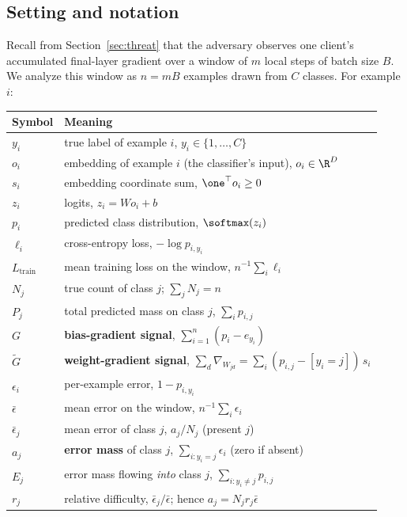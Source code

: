 \subsection{Setting and notation}
\label{sec:prelim-notation}

Recall from Section~\ref{sec:threat} that the adversary observes one
client's accumulated final-layer gradient over a window of $m$ local
steps of batch size $B$. We analyze this window as $n = mB$ examples drawn
from $C$ classes. For example $i$:

\begin{center}
\small
\renewcommand{\arraystretch}{1.15}
\begin{tabular}{@{}l p{}@{}}
\toprule
Symbol & Meaning \\
\midrule
$y_i$ & true label of example $i$, $y_i \in \{1,\dots,C\}$ \\
$o_i$ & embedding of example $i$ (the classifier's input), $o_i \in \R^D$ \\
$s_i$ & embedding coordinate sum, $\one^\top o_i \ge 0$ \\
$z_i$ & logits, $z_i = W o_i + b$ \\
$p_i$ & predicted class distribution, $\softmax(z_i)$ \\
$\ell_i$ & cross-entropy loss, $-\log p_{i,y_i}$ \\
$L_{\mathrm{train}}$ & mean training loss on the window, $n^{-1}\sum_i \ell_i$ \\
\midrule
$N_j$ & true count of class $j$; $\sum_j N_j = n$ \\
$P_j$ & total predicted mass on class $j$, $\sum_i p_{i,j}$ \\
$G$ & \textbf{bias-gradient signal}, $\sum_{i=1}^n (p_i - e_{y_i})$ \\
$\widetilde G$ & \textbf{weight-gradient signal}, $\sum_d \nabla_{W_{jd}} = \sum_i (p_{i,j}-[y_i{=}j])\,s_i$ \\
\midrule
$\epsilon_i$ & per-example error, $1 - p_{i,y_i}$ \\
$\bar\epsilon$ & mean error on the window, $n^{-1}\sum_i \epsilon_i$ \\
$\bar\epsilon_j$ & mean error of class $j$, $a_j/N_j$ (present $j$) \\
$a_j$ & \textbf{error mass} of class $j$, $\sum_{i:y_i=j}\epsilon_i$ (zero if absent) \\
$E_j$ & error mass flowing \emph{into} class $j$, $\sum_{i:y_i\ne j} p_{i,j}$ \\
\midrule
$r_j$ & relative difficulty, $\bar\epsilon_j/\bar\epsilon$; hence $a_j = N_j r_j \bar\epsilon$ \\

\end{tabular}
\end{center}
